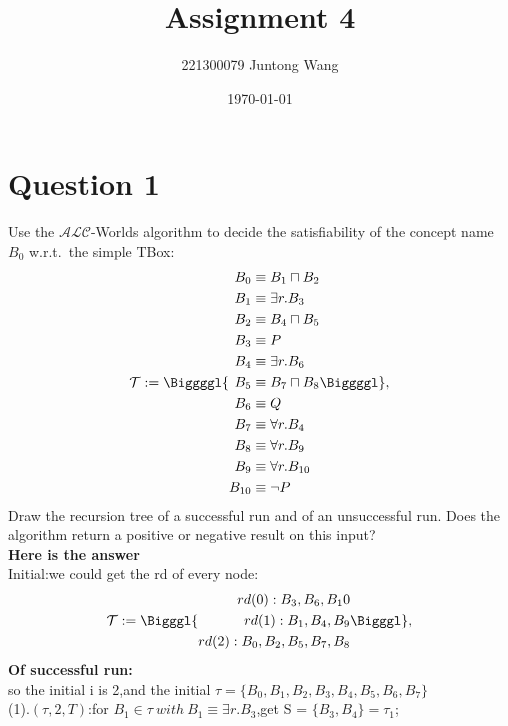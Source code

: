 \documentclass{article}
\title{Assignment 4}
\author{221300079 Juntong Wang}
\date{\today}
\begin{document}
	\maketitle

	\section{Question 1}
    Use the $\mathcal{ALC}$-Worlds algorithm to decide the satisfiability of the concept name $B_0$ w.r.t.\ the simple TBox:
    \begin{equation*}
    \mathcal{T}:=\Biggggl\{
    \begin{aligned} 
    B_0&\equiv B_1\sqcap B_2\\
    B_1&\equiv\exists r.B_3\\
    B_2&\equiv B_4\sqcap B_5\\
    B_3&\equiv P\\
    B_4&\equiv\exists r.B_6\\
    B_5&\equiv B_7\sqcap B_8\\
    B_6&\equiv Q\\
    B_7&\equiv\forall r.B_4\\
    B_8&\equiv\forall r.B_9\\
    B_9&\equiv\forall r.B_{10}\\
    B_{10}&\equiv\neg P
    \end{aligned}
    \Biggggl\},
    \end{equation*}
    Draw the recursion tree of a successful run and of an unsuccessful run. Does the algorithm return a positive or negative result on this input?\\
    \textbf{Here is the answer}\\
    Initial:we could get the rd of every node:
    \begin{equation*}
    \mathcal{T}:=\Bigggl\{
        \begin{aligned} 
        rd(0):B_3,B_6,B_10\\
        rd(1):B_1,B_4,B_9\\
        rd(2):B_0,B_2,B_5,B_7,B_8\\
        \end{aligned}
        \Bigggl\},
    \end{equation*}
    \textbf{Of successful run:}\\
    so the initial i is 2,and the initial $\tau = \{B_0,B_1,B_2,B_3,B_4,B_5,B_6,B_7\}$\\
    (1).$(\tau,2,T)$:for $B_1 \in\tau\ with\ B_1 \equiv\exists r.B_3$,get S = $\{B_3,B_4\}= \tau_1$;\\
\end{document}
